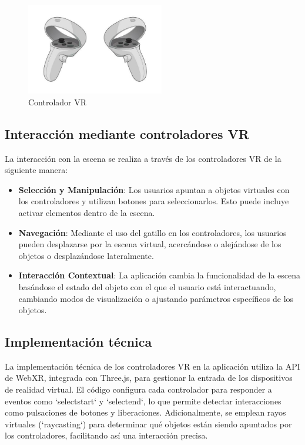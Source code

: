\documentclass[a4paper, 12pt]{book}
\begin{document}
\begin{figure}
  \centering
  \includegraphics[width=6cm, keepaspectratio]{img/controlador.png}
  \caption{Controlador VR}
  \label{fig:controlador}
\end{figure}


\subsection{Interacción mediante controladores VR}
\label{subsec:interaccion_controladores_vr}

La interacción con la escena se realiza a través de los controladores VR de la siguiente manera:

\begin{itemize}
  \item \textbf{Selección y Manipulación}: Los usuarios apuntan a objetos virtuales con los controladores y utilizan 
  botones para seleccionarlos. Esto puede incluye activar elementos dentro de la escena.
  \item \textbf{Navegación}: Mediante el uso del gatillo en los controladores, 
  los usuarios pueden desplazarse por la escena virtual, acercándose o alejándose de los objetos o desplazándose lateralmente.
  \item \textbf{Interacción Contextual}: La aplicación cambia la funcionalidad de la escena 
  basándose el estado del objeto con el que el usuario está interactuando, 
  cambiando modos de visualización o ajustando parámetros específicos de los objetos.
\end{itemize}

\subsection{Implementación técnica}
\label{subsec:implementacion_tecnica_vr}

La implementación técnica de los controladores VR en la aplicación utiliza la API de WebXR, integrada con Three.js, para gestionar la entrada 
de los dispositivos de realidad virtual. El código configura cada controlador para responder a eventos como `selectstart` y `selectend`, 
lo que permite detectar interacciones como pulsaciones de botones y liberaciones. Adicionalmente, se emplean rayos virtuales (`raycasting`) 
para determinar qué objetos están siendo apuntados por los controladores, facilitando así una interacción precisa.
\end{document}
